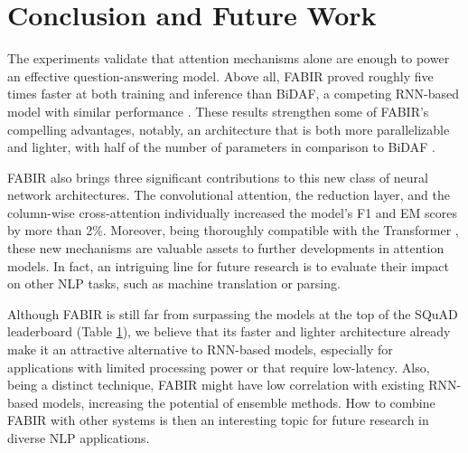 \documentclass[conference, letterpaper, 10pt]{IEEEtran}
\begin{document}
\begin{table}[!htb]
\begin{tabular}{| c || c | c |}
        \hline
        \end{tabular}
    \label{tab:SQuAD_comparison}
\end{table}

\section{Conclusion and Future Work}
The experiments validate that attention mechanisms alone are enough to power an effective question-answering model. Above all, FABIR proved roughly five times faster at both training and inference than BiDAF, a competing RNN-based model with similar performance \cite{Seo2016}. These results strengthen some of FABIR's compelling advantages, notably, an architecture that is both more parallelizable and lighter, with half of the number of parameters in comparison to BiDAF \cite{Seo2016}.

FABIR also brings three significant contributions to this new class of neural network architectures. The convolutional attention, the reduction layer, and the column-wise cross-attention individually increased the model's F1 and EM scores by more than 2\%. Moreover, being thoroughly compatible with the Transformer \cite{Vaswani}, these new mechanisms are valuable assets to further developments in attention models. In fact, an intriguing line for future research is to evaluate their impact on other NLP tasks, such as machine translation or parsing.

Although FABIR is still far from surpassing the models at the top of the SQuAD leaderboard (Table \ref{tab:SQuAD_comparison}), we believe that its faster and lighter architecture already make it an attractive alternative to RNN-based models, especially for applications with limited processing power or that require low-latency. Also, being a distinct technique, FABIR might have low correlation with existing RNN-based models, increasing the potential of ensemble methods. How to combine FABIR with other systems is then an interesting topic for future research in diverse NLP applications.



























\newpage







\end{document}
